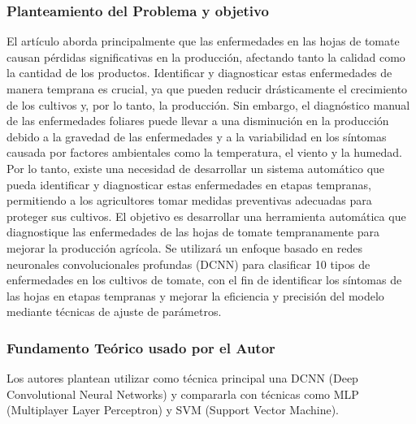 \subsubsection{Planteamiento del Problema y objetivo }

El artículo aborda principalmente que las enfermedades en las hojas de tomate causan pérdidas significativas en la producción, afectando tanto la calidad como la cantidad de los productos. Identificar y diagnosticar estas enfermedades de manera temprana es crucial, ya que pueden reducir drásticamente el crecimiento de los cultivos y, por lo tanto, la producción. Sin embargo, el diagnóstico manual de las enfermedades foliares puede llevar a una disminución en la producción debido a la gravedad de las enfermedades y a la variabilidad en los síntomas causada por factores ambientales como la temperatura, el viento y la humedad. Por lo tanto, existe una necesidad de desarrollar un sistema automático que pueda identificar y diagnosticar estas enfermedades en etapas tempranas, permitiendo a los agricultores tomar medidas preventivas adecuadas para proteger sus cultivos. El objetivo es desarrollar una herramienta automática que diagnostique las enfermedades de las hojas de tomate tempranamente para mejorar la producción agrícola. Se utilizará un enfoque basado en redes neuronales convolucionales profundas (DCNN) para clasificar 10 tipos de enfermedades en los cultivos de tomate, con el fin de identificar los síntomas de las hojas en etapas tempranas y mejorar la eficiencia y precisión del modelo mediante técnicas de ajuste de parámetros.

\subsubsection{Fundamento Teórico usado por el Autor}

Los autores plantean utilizar como técnica principal una DCNN (Deep Convolutional Neural Networks) y compararla con técnicas como MLP (Multiplayer Layer Perceptron) y SVM (Support Vector Machine).




